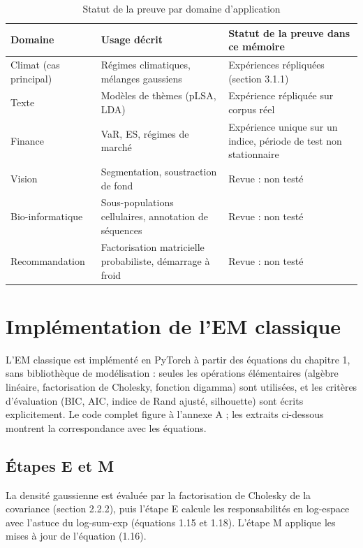 \begin{table}[H]
\centering
\small
\setlength{\tabcolsep}{0.14cm}
\begin{tabular}{|p{3.6cm}|p{5.4cm}|p{5.2cm}|}
\hline
\textbf{Domaine} & \textbf{Usage décrit} & \textbf{Statut de la preuve dans ce mémoire} \\
\hline
Climat (cas principal) & Régimes climatiques, mélanges gaussiens & Expériences répliquées (section 3.1.1) \\
\hline
Texte & Modèles de thèmes (pLSA, LDA) & Expérience répliquée sur corpus réel \\
\hline
Finance & VaR, ES, régimes de marché & Expérience unique sur un indice, période de test non stationnaire \\
\hline
Vision & Segmentation, soustraction de fond & Revue : non testé \\
\hline
Bio-informatique & Sous-populations cellulaires, annotation de séquences & Revue : non testé \\
\hline
Recommandation & Factorisation matricielle probabiliste, démarrage à froid & Revue : non testé \\
\hline
\end{tabular}
\caption{Statut de la preuve par domaine d'application}
\label{tab:3_1}
\end{table}

\section{Implémentation de l'EM classique}
L'EM classique est implémenté en PyTorch à partir des équations du chapitre 1, sans bibliothèque de modélisation : seules les opérations élémentaires (algèbre linéaire, factorisation de Cholesky, fonction digamma) sont utilisées, et les critères d'évaluation (BIC, AIC, indice de Rand ajusté, silhouette) sont écrits explicitement. Le code complet figure à l'annexe A ; les extraits ci-dessous montrent la correspondance avec les équations.

\subsection{Étapes E et M}
La densité gaussienne est évaluée par la factorisation de Cholesky de la covariance (section 2.2.2), puis l'étape E calcule les responsabilités en log-espace avec l'astuce du log-sum-exp (équations 1.15 et 1.18). L'étape M applique les mises à jour de l'équation (1.16).

